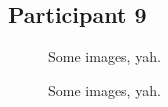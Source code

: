 \clearpage

\subsection{Participant 9}

\begin{figure}[h]
	\caption{Some images, yah.}
\end{figure}

\lipsum[1]

\clearpage

\begin{figure}[h]
	\caption{Some images, yah.}
\end{figure}

